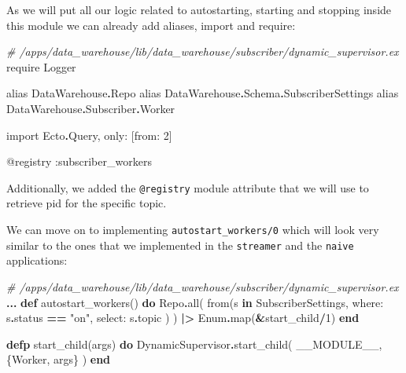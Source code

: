 \documentclass[
]{book}
\newenvironment{Shaded}{\begin{snugshade}}{\end{snugshade}}
\newcommand{\CommentTok}[1]{\textcolor[rgb]{0.56,0.35,0.01}{\textit{#1}}}
\newcommand{\ConstantTok}[1]{\textcolor[rgb]{0.00,0.00,0.00}{#1}}
\newcommand{\DecValTok}[1]{\textcolor[rgb]{0.00,0.00,0.81}{#1}}
\newcommand{\ImportTok}[1]{#1}
\newcommand{\KeywordTok}[1]{\textcolor[rgb]{0.13,0.29,0.53}{\textbf{#1}}}
\newcommand{\NormalTok}[1]{#1}
\newcommand{\OperatorTok}[1]{\textcolor[rgb]{0.81,0.36,0.00}{\textbf{#1}}}
\newcommand{\OtherTok}[1]{\textcolor[rgb]{0.56,0.35,0.01}{#1}}
\newcommand{\StringTok}[1]{\textcolor[rgb]{0.31,0.60,0.02}{#1}}
\newcommand{\VariableTok}[1]{\textcolor[rgb]{0.00,0.00,0.00}{#1}}
\begin{document}
As we will put all our logic related to autostarting, starting and stopping inside this module we can already add aliases, import and require:

\begin{Shaded}
\begin{Highlighting}[]
\CommentTok{\# /apps/data\_warehouse/lib/data\_warehouse/subscriber/dynamic\_supervisor.ex}
  \ImportTok{require} \ConstantTok{Logger}

  \ImportTok{alias} \ConstantTok{DataWarehouse}\OperatorTok{.}\ConstantTok{Repo}
  \ImportTok{alias} \ConstantTok{DataWarehouse}\OperatorTok{.}\ConstantTok{Schema}\OperatorTok{.}\ConstantTok{SubscriberSettings}
  \ImportTok{alias} \ConstantTok{DataWarehouse}\OperatorTok{.}\ConstantTok{Subscriber}\OperatorTok{.}\ConstantTok{Worker}

  \ImportTok{import} \ConstantTok{Ecto}\OperatorTok{.}\ConstantTok{Query}\NormalTok{, }\VariableTok{only:}\NormalTok{ [}\VariableTok{from:} \DecValTok{2}\NormalTok{]}

  \OtherTok{@registry} \VariableTok{:subscriber\_workers}
\end{Highlighting}
\end{Shaded}

Additionally, we added the \texttt{@registry} module attribute that we will use to retrieve pid for the specific topic.

We can move on to implementing \texttt{autostart\_workers/0} which will look very similar to the ones that we implemented in the \texttt{streamer} and the \texttt{naive} applications:

\begin{Shaded}
\begin{Highlighting}[]
  \CommentTok{\# /apps/data\_warehouse/lib/data\_warehouse/subscriber/dynamic\_supervisor.ex}
  \OperatorTok{...}
  \KeywordTok{def}\NormalTok{ autostart\_workers() }\KeywordTok{do}
    \ConstantTok{Repo}\OperatorTok{.}\NormalTok{all(}
\NormalTok{      from(s }\KeywordTok{in} \ConstantTok{SubscriberSettings}\NormalTok{,}
        \VariableTok{where:}\NormalTok{ s}\OperatorTok{.}\NormalTok{status }\OperatorTok{==} \StringTok{"on"}\NormalTok{,}
        \VariableTok{select:}\NormalTok{ s}\OperatorTok{.}\NormalTok{topic}
\NormalTok{      )}
\NormalTok{    )}
    \OperatorTok{|\textgreater{}} \ConstantTok{Enum}\OperatorTok{.}\NormalTok{map(}\OperatorTok{\&}\NormalTok{start\_child}\OperatorTok{/}\DecValTok{1}\NormalTok{)}
  \KeywordTok{end}

  \KeywordTok{defp}\NormalTok{ start\_child(args) }\KeywordTok{do}
    \ConstantTok{DynamicSupervisor}\OperatorTok{.}\NormalTok{start\_child(}
      \ConstantTok{\_\_MODULE\_\_}\NormalTok{,}
\NormalTok{      \{}\ConstantTok{Worker}\NormalTok{, args\}}
\NormalTok{    )}
  \KeywordTok{end}
\end{Highlighting}
\end{Shaded}
\end{document}
